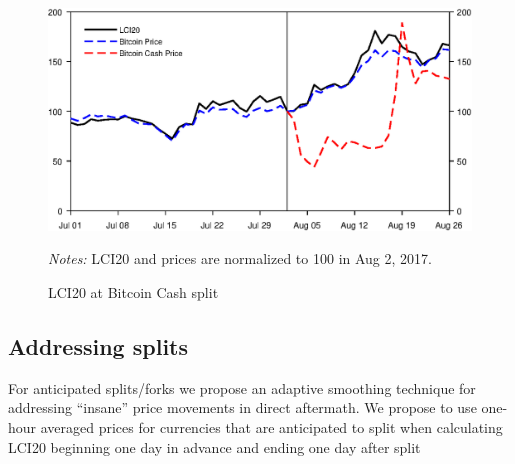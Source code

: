 \documentclass[11pt]{article}
\newcommand\fnotes[1]{\captionsetup{font=scriptsize}\caption*{\textsl{Notes:} #1}}
\begin{document}
\begin{figure}[p]%
    \centering%
    \caption{LCI20 at Bitcoin Cash split}\label{f:split}%
    \includegraphics[width=\textwidth]{figs/lci20_bch_split.eps}%
    \medskip\newline%
    \fnotes{LCI20 and prices are normalized to 100 in Aug 2, 2017.}
\end{figure}



\pagebreak


\subsection{Addressing splits}\label{subseq:split_smoothing}
For anticipated splits/forks we propose an adaptive smoothing technique for addressing ``insane'' price movements in direct aftermath.
We propose to use one-hour averaged prices for currencies that are anticipated to split when calculating LCI20 beginning one day in advance and ending one day after split
\end{document}
